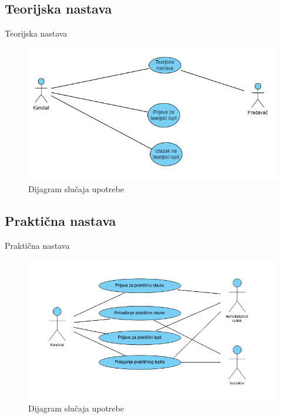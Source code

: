 \documentclass[compress, containsverbatim,mathserif, xcolor=dvipsnames, unicode]{beamer}
\begin{document}
\subsection{Teorijska nastava}
\begin{frame}{Teorijska nastava}
        \begin{figure}[h!]
        \begin{center}
          \includegraphics[scale = 0.6]{diagram teorijska nastava.png}
        \end{center}
       \caption{Dijagram slučaja upotrebe}
    \end{figure}   
\end{frame}



\subsection{Praktična nastava}
\begin{frame}{Praktična nastava}
        \begin{figure}[h!]
        \begin{center}
          \includegraphics[scale = 0.4]{prakticna_obuka.png}
        \end{center}
       \caption{Dijagram slučaja upotrebe}
    \end{figure}   
\end{frame}
\end{document}
